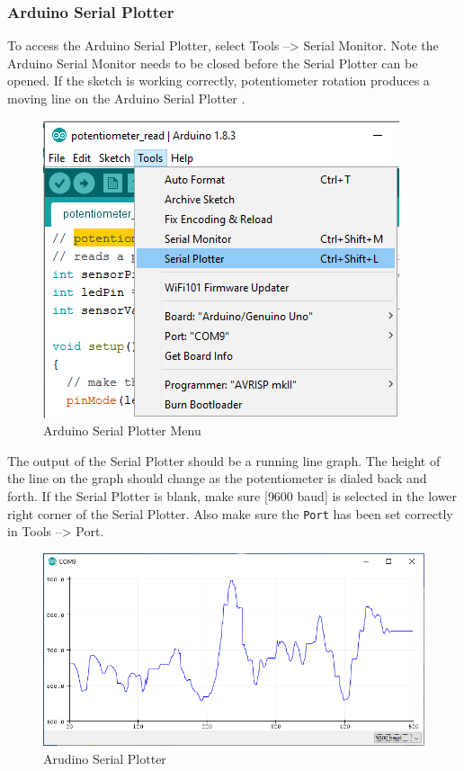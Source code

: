 \documentclass{book}
\makeatletter
\def\maxwidth{\ifdim\Gin@nat@width>\linewidth\linewidth
    \else\Gin@nat@width\fi}
\let\Oldincludegraphics\includegraphics
\renewcommand{\includegraphics}[1]{\Oldincludegraphics[width=.8\maxwidth]{#1}}
\makeatother
\begin{document}
    
        \subsubsection{Arduino Serial Plotter}\label{arduino-serial-plotter}

To access the Arduino Serial Plotter, select Tools --\textgreater{}
Serial Monitor. Note the Arduino Serial Monitor needs to be closed
before the Serial Plotter can be opened. If the sketch is working
correctly, potentiometer rotation produces a moving line on the Arduino
Serial Plotter .

\begin{figure}
\centering
\includegraphics{images/Tools_SerialPlotter.png}
\caption{Arduino Serial Plotter Menu}
\end{figure}

The output of the Serial Plotter should be a running line graph. The
height of the line on the graph should change as the potentiometer is
dialed back and forth. If the Serial Plotter is blank, make sure {[}9600
baud{]} is selected in the lower right corner of the Serial Plotter.
Also make sure the \lstinline!Port! has been set correctly in Tools
--\textgreater{} Port.

\begin{figure}
\centering
\includegraphics{images/serial_plotter_output.png}
\caption{Arudino Serial Plotter}
\end{figure}
    
\end{document}
